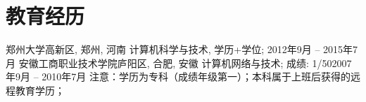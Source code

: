 \section{\textbf{教育经历}}
  \resumeSubHeadingListStart
    \resumeSubheading
      {郑州大学}{高新区, 郑州, 河南}
      {计算机科学与技术, 学历+学位; }{2012年9月 -- 2015年7月}
    \resumeSubheading
      {安徽工商职业技术学院}{庐阳区, 合肥, 安徽}
      {计算机网络与技术; 成绩: 1/50}{2007年9月 -- 2010年7月}
  \resumeSubHeadingListEnd
  \noindent\tiny 注意：学历为专科（成绩年级第一）；本科属于上班后获得的远程教育学历；